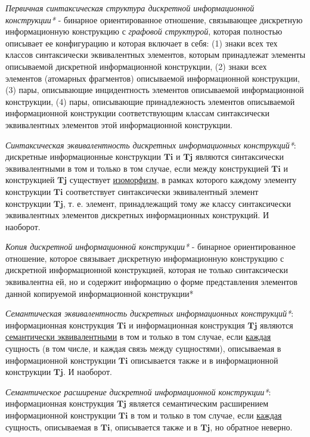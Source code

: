 \textit{Первичная синтаксическая структура дискретной информационной конструкции*} - бинарное ориентированное отношение, связывающее дискретную информационную конструкцию с \textit{графовой структурой}, которая полностью описывает ее конфигурацию и которая включает в себя: (1) знаки всех тех классов синтаксически эквивалентных элементов, которым принадлежат элементы описываемой дискретной информационной конструкции, (2) знаки всех элементов (атомарных фрагментов) описываемой информационной конструкции, (3) пары, описывающие инцидентность элементов описываемой информационной конструкции, (4) пары, описывающие принадлежность элементов описываемой информационной конструкции соответствующим классам синтаксически эквивалентных элементов этой информационной конструкции.

\textit{Синтаксическая эквивалентность дискретных информационных конструкций*}: дискретные информационные конструкции $\bm{Ti}$ и $\bm{Tj}$ являются синтаксически эквивалентными в том и только в том случае, если между конструкцией $\bm{Ti}$ и конструкцией $\bm{Tj}$ существует \underline{изоморфизм}, в рамках которого каждому элементу конструкции $\bm{Ti}$ соответствует синтаксически эквивалентный элемент конструкции $\bm{Tj}$, т. е. элемент, принадлежащий тому же классу синтаксически эквивалентных элементов дискретных информационных конструкций.
И наоборот.

\textit{Копия дискретной информационной конструкции*} - бинарное ориентированное отношение, которое связывает дискретную информационную конструкцию с дискретной информационной конструкцией, которая не только синтаксически эквивалентна ей, но и содержит информацию о форме представления элементов данной копируемой информационной конструкции*

\begin{SCn}
\end{SCn}

\textit{Семантическая эквивалентность дискретных информационных конструкций*}: информационная конструкция $\bm{Ti}$ и информационная конструкция $\bm{Tj}$ являются \underline{семантически эквивалентными} в том и только в том случае, если \underline{каждая} сущность (в том числе, и каждая связь между сущностями), описываемая в информационной конструкции $\bm{Ti}$ описывается также и в информационной конструкции $\bm{Tj}$.
И наоборот.

\textit{Семантическое расширение дискретной информационной конструкции*}: информационная конструкция $\bm{Tj}$ является семантическим расширением информационной конструкции $\bm{Ti}$ в том и только в том случае, если \underline{каждая} сущность, описываемая в $\bm{Ti}$, описывается также и в $\bm{Tj}$, но обратное неверно.

